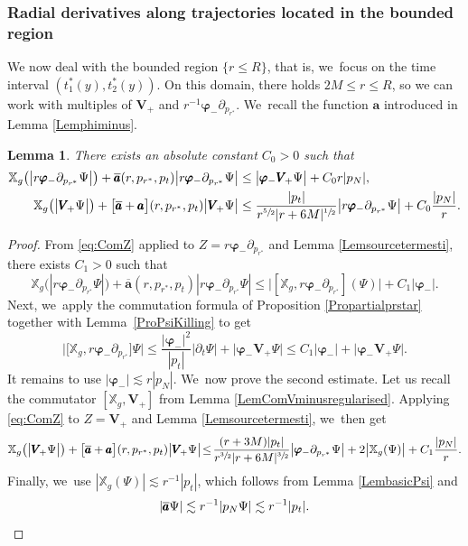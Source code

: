 \documentclass[JEP,XML,SOM,Unicode,published]{cedram}
\theoremstyle{plain}
\newtheorem{lemma}[proposition]{Lemma}
\theoremstyle{definition}
\newcommand\T{{\mathbb{X}}}
\begin{document}
\subsubsection{Radial derivatives along trajectories located in the bounded region}
We now deal with the bounded region $\{ r \leq R \}$, that is, we~focus on the time interval $(t_1^*(y),t_2^*(y))$. On this domain, there holds $2M \leq r \leq R$, so we can work with multiples of $\pmb{V}_{\! +}$ and $ r^{-1}\pmb{\varphi}_- \partial_{p_{r^*}}$. We~recall the function $\pmb{a}$ introduced in Lemma \ref{Lemphiminus}.
\begin{lemma}\label{LemComPsi00}
There exists an absolute constant $C_0 >0$ such that
\begin{align*}
\T_g \bigl(\big| r \pmb{\varphi}_- \partial_{p_{r^*}} \Psi \big| \bigr) +\overline{\pmb{a}} (r,p_{r^*},p_t) \big| r \pmb{\varphi}_- \partial_{p_{r^*}} \Psi \big| & \leq \big|\pmb{\varphi}_- \pmb{V}_{\! +} \Psi \big|+C_0r|p_N|, \\
\T_g \bigl(\big| \pmb{V}_{\! +} \Psi \big| \bigr) + \bigl[\overline{\pmb{a}}+\pmb{a} \bigr](r,p_{r^*},p_t) \big| \pmb{V}_{\! +} \Psi \big| & \leq \frac{|p_t|}{r^{\sfrac{5}{2}}|r+6M|^{\sfrac{1}{2}}}\big| r \pmb{\varphi}_- \partial_{p_{r^*}}\Psi \big|+C_0\frac{|p_N|}{r}.
\end{align*}
\end{lemma}

\begin{proof}
From \eqref{eq:ComZ} applied to $Z=r \pmb{\varphi}_- \partial_{p_{r^*}}$ and Lemma \ref{Lemsourcetermesti}, there exists $C_1>0$ such that
\begin{equation*}\label{eq:Psi1}
\T_g \bigl(| r \pmb{\varphi}_- \partial_{p_{r^*}} \Psi | \bigr) + \overline{\pmb{a}} (r,p_{r^*},p_t) | r \pmb{\varphi}_- \partial_{p_{r^*}} \Psi | \leq \big|[\T_g, r \pmb{\varphi}_- \partial_{p_{r^*}} ](\Psi) \big|+C_1|\pmb{\varphi}_-|.
\end{equation*}
Next, we~apply the commutation formula of Proposition \ref{Propartialprstar} together with Lem\-ma~\ref{ProPsiKilling} to get
\[
\big| \bigl[\T_g, r \pmb{\varphi}_- \partial_{p_{r^*}} \bigr]\Psi \big| \leq \frac{|\pmb{\varphi}_-|^2}{ |p_t| }\big| \partial_t \Psi \big| + \big|\pmb{\varphi}_- \pmb{V}_{\! +} \Psi \big| \leq C_1|\pmb{\varphi}_-| + \big|\pmb{\varphi}_- \pmb{V}_{\! +} \Psi \big|.
\]
It remains to use $|\pmb{\varphi}_-| \lesssim r|p_N|$. We~now prove the second estimate. Let us recall the commutator $[\T_g,\pmb{V}_{\! +}]$ from Lemma \ref{LemComVminusregularised}. Applying \eqref{eq:ComZ} to $Z=\pmb{V}_{\! +}$ and Lemma \ref{Lemsourcetermesti}, we~then get
\[
\T_g \bigl(\big| \pmb{V}_{\! +} \Psi \big| \bigr) + \bigl[ \overline{\pmb{a}}+\pmb{a}\bigr](r,p_{r^*},p_t) \big| \pmb{V}_{\! +} \Psi \big| \!\leq\! \frac{(r+3M)|p_t|}{r^{\sfrac{3}{2}}|r+6M|^{\sfrac{3}{2}}}\big| \pmb{\varphi}_- \partial_{p_{r^*}} \Psi \big| +2\big| \T_g (\Psi) \big|+C_1\frac{|p_N|}{r }.
\]
Finally, we~use $|\T_g(\Psi)|\lesssim r^{-1}|p_t| $, which follows from Lemma \ref{LembasicPsi} and
\[|\overline{\pmb{a}} \Psi| \lesssim r^{-1}|p_N \Psi| \lesssim r^{-1} |p_t|.\qedhere
\]
\end{proof}
\end{document}
